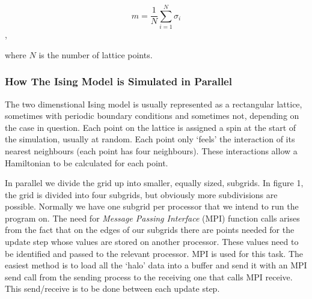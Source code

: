 \documentclass[pdftex,12pt,a4paper]{article}
\begin{document}
\[ m = \frac{1}{N} \sum_{i=1}^N \sigma_i \],

where $N$ is the number of lattice points.


\subsubsection{How The Ising Model is Simulated in Parallel}

The two dimenstional Ising model is usually represented as a rectangular lattice, sometimes with periodic boundary conditions and sometimes not, depending on the case in question. Each point on the lattice is assigned a spin at the start of the simulation, usually at random. Each point only `feels' the interaction of its nearest neighbours (each point has four neighbours). These interactions allow a Hamiltonian to be calculated for each point.

In parallel we divide the grid up into smaller, equally sized, subgrids. In figure 1, the grid is divided into four subgrids, but obviously more subdivisions are possible. Normally we have one subgrid per processor that we intend to run the program on. The need for \emph{Message Passing Interface} (MPI) function calls arises from the fact that on the edges of our subgrids there are points needed for the update step whose values are stored on another processor. These values need to be identified and passed to the relevant processor. MPI is used for this task. The easiest method is to load all the `halo' data into a buffer and send it with an MPI send call from the sending process to the receiving one that calls MPI receive. This send/receive is to be done between each update step.
\end{document}
